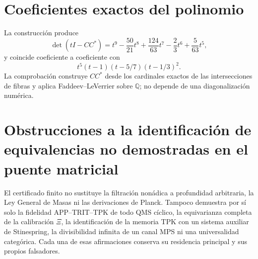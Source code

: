 \section{Coeficientes exactos del polinomio}

La construcción produce
\[
 \det(tI-CC^*)
 =t^9-\frac{50}{21}t^8+\frac{124}{63}t^7
  -\frac23t^6+\frac5{63}t^5,
 \tag{GMC-A.1}
\]
y coincide coeficiente a coeficiente con
\[
 t^5(t-1)(t-5/7)(t-1/3)^2.
 \tag{GMC-A.2}
\]
La comprobación construye \(CC^*\) desde los cardinales exactos de las
intersecciones de fibras y aplica Faddeev--LeVerrier sobre \(\mathbb Q\); no
depende de una diagonalización numérica.

\section{Obstrucciones a la identificación de equivalencias no demostradas en el puente matricial}

El certificado finito no sustituye la filtración nonádica a profundidad arbitraria, la
Ley General de Masas ni las derivaciones de Planck. Tampoco demuestra por sí
solo la fidelidad APP--TRIT--TPK de todo QMS cíclico, la equivarianza completa
de la calibración \(\Xi\), la identificación de la memoria TPK con un sistema
auxiliar de Stinespring, la divisibilidad infinita de un canal MPS ni una
universalidad categórica. Cada una de esas afirmaciones conserva su residencia
principal y sus propios falsadores.
